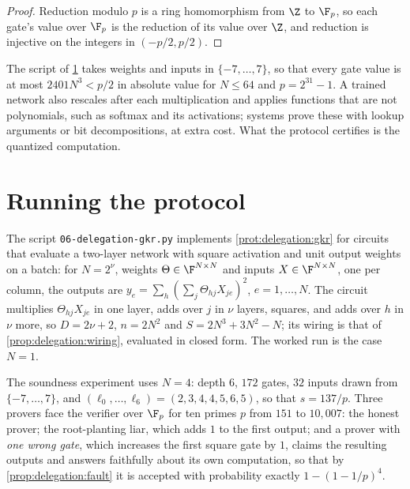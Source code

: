 \begin{refsection}
\begin{proof}
Reduction modulo $p$ is a ring homomorphism from $\Z$ to $\F_p$, so each gate's value over $\F_p$ is the reduction of its value over $\Z$, and reduction is injective on the integers in $(-p/2,p/2)$.
\end{proof}

The script of \cref{sec:delegation:running} takes weights and inputs in $\{-7,\dots,7\}$, so that every gate value is at most $2401N^3<p/2$ in absolute value for $N\le64$ and $p=2^{31}-1$. A trained network also rescales after each multiplication and applies functions that are not polynomials, such as softmax and its activations; systems prove these with lookup arguments or bit decompositions, at extra cost. What the protocol certifies is the quantized computation.

\section{Running the protocol}\label{sec:delegation:running}

The script \texttt{06-delegation-gkr.py} implements \cref{prot:delegation:gkr} for circuits that evaluate a two-layer network with square activation and unit output weights on a batch: for $N=2^\nu$, weights $\Theta\in\F^{N\times N}$ and inputs $X\in\F^{N\times N}$, one per column, the outputs are $y_e=\sum_h(\sum_j\Theta_{hj}X_{je})^2$, $e=1,\dots,N$. The circuit multiplies $\Theta_{hj}X_{je}$ in one layer, adds over $j$ in $\nu$ layers, squares, and adds over $h$ in $\nu$ more, so $D=2\nu+2$, $n=2N^2$ and $S=2N^3+3N^2-N$; its wiring is that of \cref{prop:delegation:wiring}, evaluated in closed form. The worked run is the case $N=1$.

The soundness experiment uses $N=4$: depth $6$, $172$ gates, $32$ inputs drawn from $\{-7,\dots,7\}$, and $(\ell_0,\dots,\ell_6)=(2,3,4,4,5,6,5)$, so that $s=137/p$. Three provers face the verifier over $\F_p$ for ten primes $p$ from $151$ to $10{,}007$: the honest prover; the root-planting liar, which adds $1$ to the first output; and a prover with \emph{one wrong gate}, which increases the first square gate by $1$, claims the resulting outputs and answers faithfully about its own computation, so that by \cref{prop:delegation:fault} it is accepted with probability exactly $1-(1-1/p)^4$.


\end{refsection}
